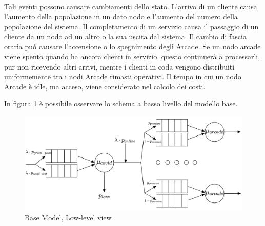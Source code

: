 \documentclass{article}
\begin{document}
Tali eventi possono causare cambiamenti dello stato. L’arrivo di un cliente causa
l’aumento della popolazione in un dato nodo e l’aumento del numero della popolazione del sistema. Il completamento di un servizio causa il passaggio di un cliente da un
nodo ad un altro o la sua uscita dal sistema. Il cambio di fascia oraria può causare
l’accensione o lo spegnimento degli Arcade. Se un nodo arcade viene spento quando ha ancora
clienti in servizio, questo continuerà a processarli, pur non ricevendo altri
arrivi, mentre i clienti in coda vengono distribuiti uniformemente tra i nodi Arcade rimasti operativi. Il tempo in cui un nodo Arcade è idle, ma acceso, viene considerato nel calcolo dei
costi.

\par In figura \ref{figura:adv_model_low_level} è possibile osservare lo schema a basso livello del modello base. 

\begin{figure}[H]
	\centering
	\captionsetup{justification=centering,margin=2cm}
	\includegraphics[scale=0.70]{images/adv_model_low_level.jpg}
	\caption{Base Model, Low-level view}\label{figura:adv_model_low_level}
\end{figure}
\end{document}
